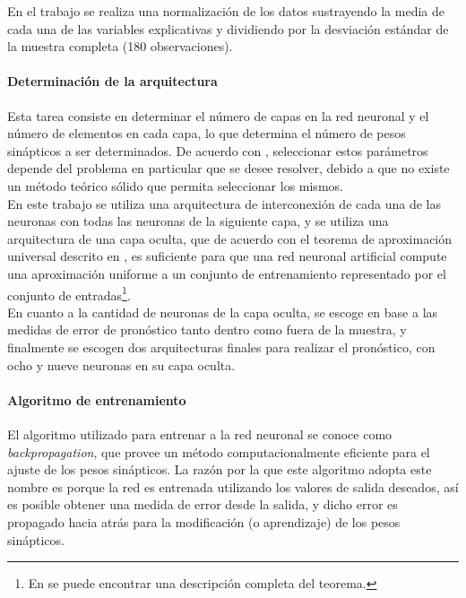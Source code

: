 En el trabajo se realiza una normalización de los datos sustrayendo la media de cada una de las variables explicativas y dividiendo por la desviación estándar de la muestra completa (180 observaciones).

\paragraph{Determinación de la arquitectura}
Esta tarea consiste en determinar el número de capas en la red neuronal y el número de elementos en cada capa, lo que determina el número de pesos sinápticos a ser determinados. De acuerdo con \textcite{sunythesis}, seleccionar estos parámetros depende del problema en particular que se desee resolver, debido a que no existe un método teórico sólido que permita seleccionar los mismos.\\

En este trabajo se utiliza una arquitectura de interconexión de cada una de las neuronas con todas las neuronas de la siguiente capa, y se utiliza una arquitectura de una capa oculta, que de acuerdo con el teorema de aproximación universal descrito en \textcite{haykin1999neural}, es suficiente para que una red neuronal artificial compute una aproximación uniforme a un conjunto de entrenamiento representado por el conjunto de entradas\footnote{En \textcite[209]{haykin1999neural} se puede encontrar una descripción completa del teorema.}.\\

En cuanto a la cantidad de neuronas de la capa oculta, se escoge en base a las medidas de error de pronóstico tanto dentro como fuera de la muestra, y finalmente se escogen dos arquitecturas finales para realizar el pronóstico, con ocho y nueve neuronas en su capa oculta.



\paragraph{Algoritmo de entrenamiento}

El algoritmo utilizado para entrenar a la red neuronal se conoce como \textit{backpropagation}, que provee un método computacionalmente eficiente para el ajuste de los pesos sinápticos. La razón por la que este algoritmo adopta este nombre es porque la red es entrenada utilizando los valores de salida deseados, así es posible obtener una medida de error desde la salida, y dicho error es propagado hacia atrás para la modificación (o aprendizaje) de los pesos sinápticos.\\

